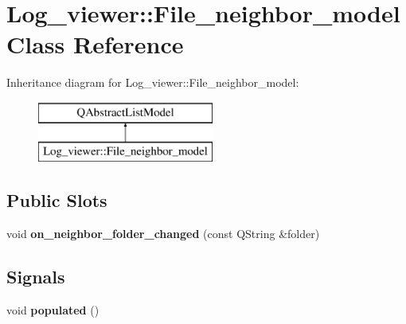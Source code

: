 \hypertarget{class_log__viewer_1_1_file__neighbor__model}{\section{Log\-\_\-viewer\-:\-:File\-\_\-neighbor\-\_\-model Class Reference}
\label{class_log__viewer_1_1_file__neighbor__model}
}
Inheritance diagram for Log\-\_\-viewer\-:\-:File\-\_\-neighbor\-\_\-model\-:\begin{figure}[H]
\begin{center}
\leavevmode
\includegraphics[height=2.000000cm]{class_log__viewer_1_1_file__neighbor__model}
\end{center}
\end{figure}
\subsection*{Public Slots}
\begin{DoxyCompactItemize}
\item 
\hypertarget{class_log__viewer_1_1_file__neighbor__model_a46b0415310949441b08c92cf6ea57aa8}{void {\bfseries on\-\_\-neighbor\-\_\-folder\-\_\-changed} (const Q\-String \&folder)}\label{class_log__viewer_1_1_file__neighbor__model_a46b0415310949441b08c92cf6ea57aa8}

\end{DoxyCompactItemize}
\subsection*{Signals}
\begin{DoxyCompactItemize}
\item 
\hypertarget{class_log__viewer_1_1_file__neighbor__model_a1f4fe308b17a3b84fbd54ffe917beab3}{void {\bfseries populated} ()}\label{class_log__viewer_1_1_file__neighbor__model_a1f4fe308b17a3b84fbd54ffe917beab3}

\end{DoxyCompactItemize}
